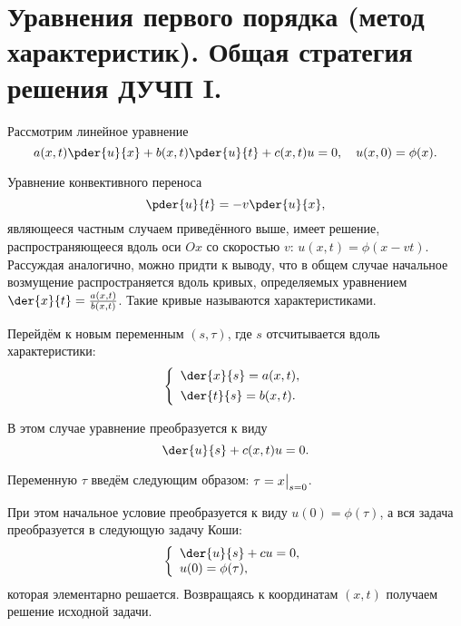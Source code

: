 \chapter{Уравнения первого порядка (метод характеристик). Общая стратегия
решения ДУЧП I.}

Рассмотрим линейное уравнение
\[
    a(x, t)\pder{u}{x} + b(x, t)\pder{u}{t} + c(x, t)u = 0, \quad
    u(x, 0) = \phi(x).
\]

Уравнение конвективного переноса
\[
    \pder{u}{t} = -v\pder{u}{x},
\]
являющееся частным случаем приведённого выше, имеет решение, распространяющееся
вдоль оси \( Ox \) со скоростью \( v \): \( u(x,t) = \phi(x-vt) \). Рассуждая
аналогично, можно придти к выводу, что в общем случае начальное возмущение
распространяется вдоль кривых, определяемых уравнением
\( \der{x}{t} = \frac{a(x,t)}{b(x,t)} \). Такие кривые называются
характеристиками. 

Перейдём к новым переменным \( (s, \tau) \), где \( s \) отсчитывается вдоль
характеристики:
\[
    \left\{ \begin{array}{l}
        \ds \der{x}{s} = a(x, t), \\[.4em]
        \ds \der{t}{s} = b(x, t).
    \end{array} \right.
\]

В этом случае уравнение преобразуется к виду
\[
    \der{u}{s} + c(x, t)u = 0.
\]

Переменную \( \tau \) введём следующим образом: \( \displaystyle \tau = x\bigr|_{s=0} \).

При этом начальное условие преобразуется к виду \( u(0) = \phi(\tau) \), а вся
задача преобразуется в следующую задачу Коши:
\[
    \left\{ \begin{array}{l}
        \ds \der{u}{s} + cu = 0, \\
        u(0) = \phi(\tau),
    \end{array} \right.
\]
которая элементарно решается. Возвращаясь к координатам \( (x, t) \) получаем
решение исходной задачи.
\newpage
